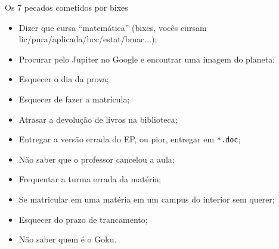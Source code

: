 \begin{editorial}{Os 7 pecados cometidos por bixes}

\begin{itemize}
  \item Dizer que cursa ``matemática'' (bixes, vocês cursam
        lic/pura/aplicada/bcc/estat/bmac...);
  \item Procurar pelo Jupiter no Google e encontrar uma imagem do planeta;
  \item Esquecer o dia da prova;
  \item Esquecer de fazer a matrícula;
  \item Atrasar a devolução de livros na biblioteca;
  \item Entregar a versão errada do EP, ou pior, entregar em \texttt{*.doc};
  \item Não saber que o professor cancelou a aula;
  \item Frequentar a turma errada da matéria;
  \item Se matricular em uma matéria em um campus do interior sem querer;
  \item Esquecer do prazo de trancamento;
  \item Não saber quem é o Goku.


\end{itemize}
\end{editorial}
